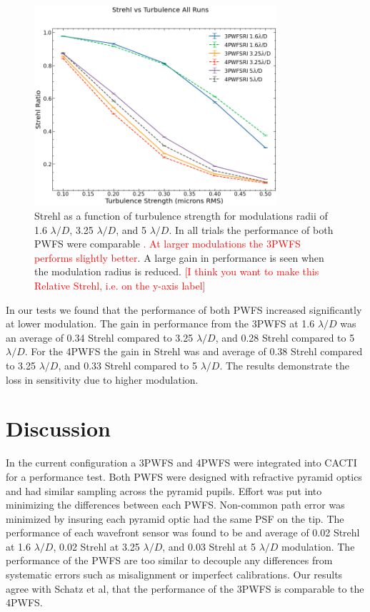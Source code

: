 \documentclass[12pt]{spieman}  %
\newcommand{\jrmadd}[1]{\textcolor{red}{#1}}
\newcommand{\jrmcom}[1]{\textcolor{red}{[#1]}}
\begin{document}
\begin{spacing}{2}
\begin{figure}
    \centering
    \includegraphics[width=0.8\textwidth]{StrehlvsTurbRI4vs3.png}
    \caption{ Strehl as a function of turbulence strength for modulations radii of 1.6 $\lambda/D$, 3.25 $\lambda/D$, and 5 $\lambda/D$. In all trials the performance of both PWFS were comparable \jrmadd{.  At larger modulations the 3PWFS performs slightly better}. A large gain in performance is seen when the modulation radius is reduced. \jrmcom{I think you want to make this Relative Strehl, i.e. on the y-axis label}}
    \label{fig:results}
\end{figure}

In our tests we found that the performance of both PWFS increased significantly at lower modulation. The gain in performance from the 3PWFS at 1.6 $\lambda/D$ was an average of 0.34 Strehl compared to 3.25 $\lambda/D$, and 0.28 Strehl compared to 5 $\lambda/D$. For the 4PWFS the gain in Strehl was and average of  0.38 Strehl compared to 3.25 $\lambda/D$, and 0.33 Strehl compared to 5 $\lambda/D$. The results demonstrate the loss in sensitivity due to higher modulation. 


\section{Discussion}

In the current configuration a 3PWFS and 4PWFS were integrated into CACTI for a performance test. Both PWFS were designed with refractive pyramid optics and had similar sampling across the pyramid pupils. Effort was put into minimizing the differences between each PWFS. Non-common path error was minimized by insuring each pyramid optic had the same PSF on the tip. The performance of each wavefront sensor was found to be and average of 0.02 Strehl at 1.6 $\lambda/D$, 0.02 Strehl at 3.25 $\lambda/D$, and 0.03 Strehl at 5 $\lambda/D$ modulation. The performance of the PWFS are too similar to decouple any differences from systematic errors such as misalignment or imperfect calibrations. Our results agree with Schatz et al, that the performance of the 3PWFS is comparable to the 4PWFS. 


\end{spacing}
\end{document}
